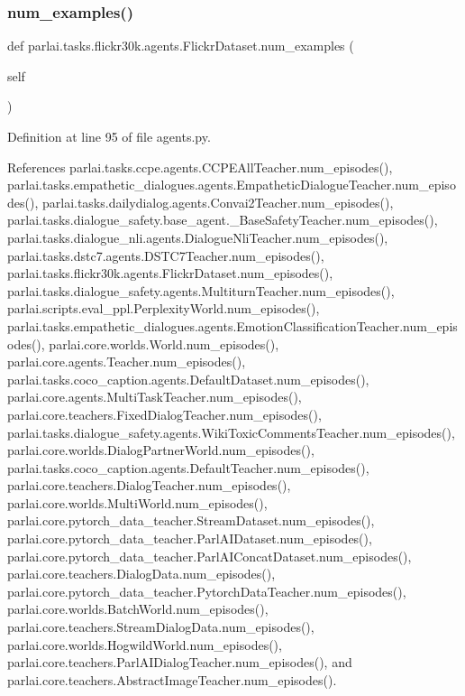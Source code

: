 \subsubsection{\texorpdfstring{num\+\_\+examples()}{num\_examples()}}
{\footnotesize\ttfamily def parlai.\+tasks.\+flickr30k.\+agents.\+Flickr\+Dataset.\+num\+\_\+examples (\begin{DoxyParamCaption}\item[{}]{self }\end{DoxyParamCaption})}



Definition at line 95 of file agents.\+py.



References parlai.\+tasks.\+ccpe.\+agents.\+C\+C\+P\+E\+All\+Teacher.\+num\+\_\+episodes(), parlai.\+tasks.\+empathetic\+\_\+dialogues.\+agents.\+Empathetic\+Dialogue\+Teacher.\+num\+\_\+episodes(), parlai.\+tasks.\+dailydialog.\+agents.\+Convai2\+Teacher.\+num\+\_\+episodes(), parlai.\+tasks.\+dialogue\+\_\+safety.\+base\+\_\+agent.\+\_\+\+Base\+Safety\+Teacher.\+num\+\_\+episodes(), parlai.\+tasks.\+dialogue\+\_\+nli.\+agents.\+Dialogue\+Nli\+Teacher.\+num\+\_\+episodes(), parlai.\+tasks.\+dstc7.\+agents.\+D\+S\+T\+C7\+Teacher.\+num\+\_\+episodes(), parlai.\+tasks.\+flickr30k.\+agents.\+Flickr\+Dataset.\+num\+\_\+episodes(), parlai.\+tasks.\+dialogue\+\_\+safety.\+agents.\+Multiturn\+Teacher.\+num\+\_\+episodes(), parlai.\+scripts.\+eval\+\_\+ppl.\+Perplexity\+World.\+num\+\_\+episodes(), parlai.\+tasks.\+empathetic\+\_\+dialogues.\+agents.\+Emotion\+Classification\+Teacher.\+num\+\_\+episodes(), parlai.\+core.\+worlds.\+World.\+num\+\_\+episodes(), parlai.\+core.\+agents.\+Teacher.\+num\+\_\+episodes(), parlai.\+tasks.\+coco\+\_\+caption.\+agents.\+Default\+Dataset.\+num\+\_\+episodes(), parlai.\+core.\+agents.\+Multi\+Task\+Teacher.\+num\+\_\+episodes(), parlai.\+core.\+teachers.\+Fixed\+Dialog\+Teacher.\+num\+\_\+episodes(), parlai.\+tasks.\+dialogue\+\_\+safety.\+agents.\+Wiki\+Toxic\+Comments\+Teacher.\+num\+\_\+episodes(), parlai.\+core.\+worlds.\+Dialog\+Partner\+World.\+num\+\_\+episodes(), parlai.\+tasks.\+coco\+\_\+caption.\+agents.\+Default\+Teacher.\+num\+\_\+episodes(), parlai.\+core.\+teachers.\+Dialog\+Teacher.\+num\+\_\+episodes(), parlai.\+core.\+worlds.\+Multi\+World.\+num\+\_\+episodes(), parlai.\+core.\+pytorch\+\_\+data\+\_\+teacher.\+Stream\+Dataset.\+num\+\_\+episodes(), parlai.\+core.\+pytorch\+\_\+data\+\_\+teacher.\+Parl\+A\+I\+Dataset.\+num\+\_\+episodes(), parlai.\+core.\+pytorch\+\_\+data\+\_\+teacher.\+Parl\+A\+I\+Concat\+Dataset.\+num\+\_\+episodes(), parlai.\+core.\+teachers.\+Dialog\+Data.\+num\+\_\+episodes(), parlai.\+core.\+pytorch\+\_\+data\+\_\+teacher.\+Pytorch\+Data\+Teacher.\+num\+\_\+episodes(), parlai.\+core.\+worlds.\+Batch\+World.\+num\+\_\+episodes(), parlai.\+core.\+teachers.\+Stream\+Dialog\+Data.\+num\+\_\+episodes(), parlai.\+core.\+worlds.\+Hogwild\+World.\+num\+\_\+episodes(), parlai.\+core.\+teachers.\+Parl\+A\+I\+Dialog\+Teacher.\+num\+\_\+episodes(), and parlai.\+core.\+teachers.\+Abstract\+Image\+Teacher.\+num\+\_\+episodes().



